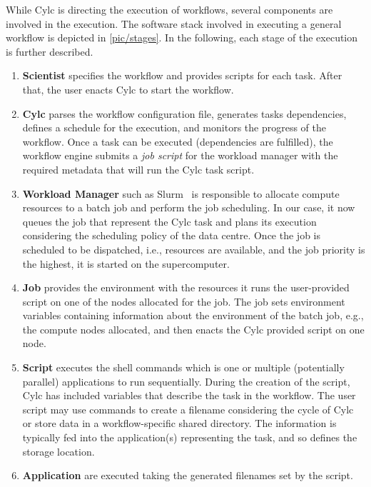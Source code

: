 \documentclass{superfri}
\begin{document}
While Cylc is directing the execution of workflows, several components are involved in the execution.
The software stack involved in executing a general workflow is depicted in \cref{pic/stages}.
In the following, each stage of the execution is further described.


\begin{enumerate}

  \item \textbf{Scientist} specifies the workflow and provides scripts for each task.
  After that, the user enacts Cylc to start the workflow.

  \item \textbf{Cylc} parses the workflow configuration file, generates tasks dependencies, defines a schedule for the execution, and monitors the progress of the workflow.
  Once a task can be executed (dependencies are fulfilled), the workflow engine submits a \textit{job script} for the workload manager with the required metadata that will run the Cylc task script.

  \item \textbf{Workload Manager} such as Slurm~\cite{Jette02slurm:simple} is responsible to allocate compute resources to a batch job and perform the job scheduling.
  In our case, it now queues the job that represent the Cylc task and plans its execution considering the scheduling policy of the data centre.
  Once the job is scheduled to be dispatched, i.e., resources are available, and the job priority is the highest, it is started on the supercomputer.

  \item \textbf{Job} provides the environment with the resources it runs the user-provided script on one of the nodes allocated for the job.
  The job sets environment variables containing information about the environment of the batch job, e.g., the compute nodes allocated, and then enacts the Cylc provided script on one node.

  \item \textbf{Script} executes the shell commands which is one or multiple (potentially parallel) applications to run sequentially.
  During the creation of the script, Cylc has included variables that describe the task in the workflow.
  The user script may use commands to create a filename considering the cycle of Cylc or store data in a workflow-specific shared directory.
  The information is typically fed into the application(s) representing the task, and so defines the storage location.

  \item \textbf{Application} are executed taking the generated filenames set by the script.
\end{enumerate}
\end{document}
